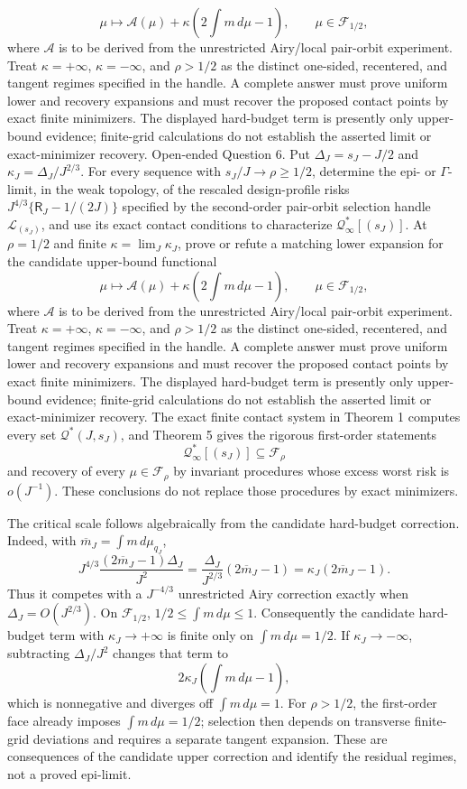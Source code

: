 \[
 \mu\longmapsto
 \mathcal A(\mu)+\kappa\left(2\int m\,d\mu-1\right),
 \qquad \mu\in\mathcal F_{1/2},
\]
where \(\mathcal A\) is to be derived from the unrestricted Airy/local pair-orbit experiment. Treat \(\kappa=+\infty\), \(\kappa=-\infty\), and \(\rho>1/2\) as the distinct one-sided, recentered, and tangent regimes specified in the handle. A complete answer must prove uniform lower and recovery expansions and must recover the proposed contact points by exact finite minimizers. The displayed hard-budget term is presently only upper-bound evidence; finite-grid calculations do not establish the asserted limit or exact-minimizer recovery.
Open-ended Question 6. Put \(\Delta_J=s_J-J/2\) and \(\kappa_J=\Delta_J/J^{2/3}\). For every sequence with \(s_J/J\to\rho\ge1/2\), determine the epi- or \(\Gamma\)-limit, in the weak topology, of the rescaled design-profile risks \(J^{4/3}\{\mathsf R_J-1/(2J)\}\) specified by the second-order pair-orbit selection handle \(\mathcal L_{(s_J)}\), and use its exact contact conditions to characterize \(\mathcal Q^*_{\infty}[(s_J)]\). At \(\rho=1/2\) and finite \(\kappa=\lim_J\kappa_J\), prove or refute a matching lower expansion for the candidate upper-bound functional
\[
 \mu\longmapsto
 \mathcal A(\mu)+\kappa\left(2\int m\,d\mu-1\right),
 \qquad \mu\in\mathcal F_{1/2},
\]
where \(\mathcal A\) is to be derived from the unrestricted Airy/local pair-orbit experiment. Treat \(\kappa=+\infty\), \(\kappa=-\infty\), and \(\rho>1/2\) as the distinct one-sided, recentered, and tangent regimes specified in the handle. A complete answer must prove uniform lower and recovery expansions and must recover the proposed contact points by exact finite minimizers. The displayed hard-budget term is presently only upper-bound evidence; finite-grid calculations do not establish the asserted limit or exact-minimizer recovery.
The exact finite contact system in Theorem 1 computes every set \(\mathcal Q^*(J,s_J)\), and Theorem 5 gives the rigorous first-order statements
\[
 \mathcal Q^*_{\infty}[(s_J)]\subseteq\mathcal F_\rho
\]
and recovery of every \(\mu\in\mathcal F_\rho\) by invariant procedures whose excess worst risk is \(o(J^{-1})\). These conclusions do not replace those procedures by exact minimizers.

The critical scale follows algebraically from the candidate hard-budget correction. Indeed, with \(\overline m_J=\int m\,d\mu_{q_J}\),
\[
 J^{4/3}
 \frac{(2\overline m_J-1)\Delta_J}{J^2}
 =\frac{\Delta_J}{J^{2/3}}(2\overline m_J-1)
 =\kappa_J(2\overline m_J-1).
\]
Thus it competes with a \(J^{-4/3}\) unrestricted Airy correction exactly when \(\Delta_J=O(J^{2/3})\). On \(\mathcal F_{1/2}\), \(1/2\le\int m\,d\mu\le1\). Consequently the candidate hard-budget term with \(\kappa_J\to+\infty\) is finite only on \(\int m\,d\mu=1/2\). If \(\kappa_J\to-\infty\), subtracting \(\Delta_J/J^2\) changes that term to
\[
 2\kappa_J\left(\int m\,d\mu-1\right),
\]
which is nonnegative and diverges off \(\int m\,d\mu=1\). For \(\rho>1/2\), the first-order face already imposes \(\int m\,d\mu=1/2\); selection then depends on transverse finite-grid deviations and requires a separate tangent expansion. These are consequences of the candidate upper correction and identify the residual regimes, not a proved epi-limit.
